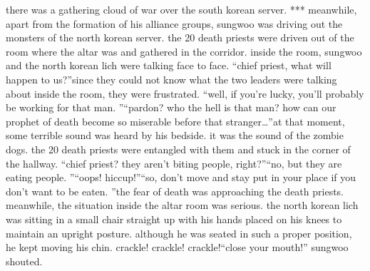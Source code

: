 there was a gathering cloud of war over the south korean server.
***
meanwhile, apart from the formation of his alliance groups, sungwoo was driving out the monsters of the north korean server.
the 20 death priests were driven out of the room where the altar was and gathered in the corridor.
 inside the room, sungwoo and the north korean lich were talking face to face.
“chief priest, what will happen to us?”since they could not know what the two leaders were talking about inside the room, they were frustrated.
“well, if you’re lucky, you’ll probably be working for that man.
”“pardon? who the hell is that man? how can our prophet of death become so miserable before that stranger…”at that moment, some terrible sound was heard by his bedside.
 it was the sound of the zombie dogs.
 the 20 death priests were entangled with them and stuck in the corner of the hallway.
“chief priest? they aren’t biting people, right?”“no, but they are eating people.
”“oops! hiccup!”“so, don’t move and stay put in your place if you don’t want to be eaten.
”the fear of death was approaching the death priests.
meanwhile, the situation inside the altar room was serious.
 the north korean lich was sitting in a small chair straight up with his hands placed on his knees to maintain an upright posture.
although he was seated in such a proper position, he kept moving his chin.
crackle! crackle! crackle!“close your mouth!” sungwoo shouted.

